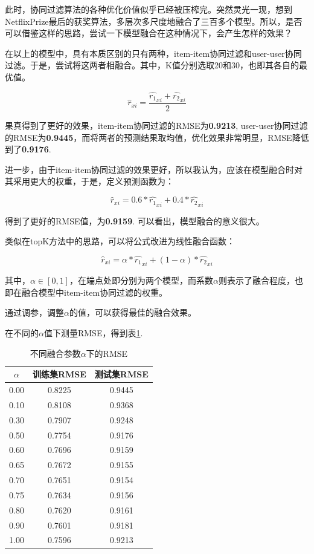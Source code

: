 \documentclass[utf8, a4paper,11pt, onecolumn]{ctexart}
\begin{document}
\begin{spacing}{1.3}
此时，协同过滤算法的各种优化价值似乎已经被压榨完。突然灵光一现，想到NetflixPrize最后的获奖算法，多层次多尺度地融合了三百多个模型。所以，是否可以借鉴这样的思路，尝试一下模型融合在这种情况下，会产生怎样的效果？

在以上的模型中，具有本质区别的只有两种，item-item协同过滤和user-user协同过滤。于是，尝试将这两者相融合。其中，K值分别选取20和30，也即其各自的最优值。

\[\hat{r}_{xi} = \frac{\hat{r_1}_{xi} + \hat{r_2}_{xi}}{2}\]

果真得到了更好的效果，item-item协同过滤的RMSE为\textbf{0.9213}, user-user协同过滤的RMSE为\textbf{0.9445}，而将两者的预测结果取均值，优化效果非常明显，RMSE降低到了\textbf{0.9176}.

进一步，由于item-item协同过滤的效果更好，所以我认为，应该在模型融合时对其采用更大的权重，于是，定义预测函数为：

\[\hat{r}_{xi} = 0.6 * \hat{r_1}_{xi} + 0.4 * \hat{r_2}_{xi}\]

得到了更好的RMSE值，为\textbf{0.9159}. 可以看出，模型融合的意义很大。

类似在topK方法中的思路，可以将公式改进为线性融合函数：

\[\hat{r}_{xi} = \alpha * \hat{r_1}_{xi} + (1-\alpha) * \hat{r_2}_{xi}\]

其中，$\alpha \in [0, 1]$，在端点处即分别为两个模型，而系数$\alpha$则表示了融合程度，也即在融合模型中item-item协同过滤的权重。

通过调参，调整$\alpha$的值，可以获得最佳的融合效果。

在不同的$\alpha$值下测量RMSE，得到表\ref{alpha-table}.

\begin{table}[h]
	\centering
	\begin{tabular}{|c|c|c|}
		\hline
		\textbf{$\alpha$} & 训练集RMSE & 测试集RMSE \\
		\hline
		0.00 & 0.8225 & 0.9445 \\
		\hline
		0.10 & 0.8108 & 0.9368 \\
		\hline
		0.30 & 0.7907 & 0.9248 \\
		\hline
		0.50 & 0.7754 & 0.9176 \\
		\hline
		0.60 & 0.7696 & 0.9159 \\
		\hline
		0.65 & 0.7672 & 0.9155 \\
		\hline
		0.70 & 0.7651 & 0.9154 \\
		\hline
		0.75 & 0.7634 & 0.9156 \\
		\hline
		0.80 & 0.7620 & 0.9161 \\
		\hline
		0.90 & 0.7601 & 0.9181 \\
		\hline
		1.00 & 0.7596 & 0.9213 \\
		\hline
	\end{tabular}
	\caption{不同融合参数$\alpha$下的RMSE}
	\label{alpha-table}
\end{table}


\end{spacing}
\end{document}
